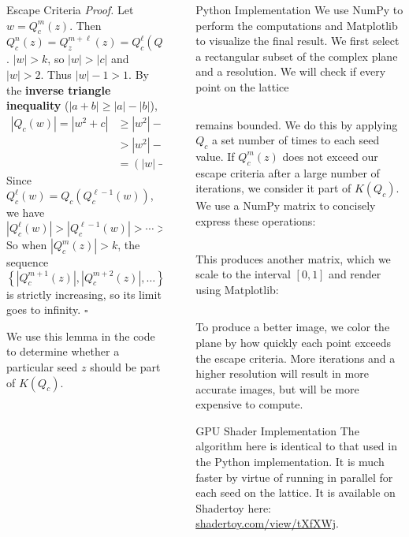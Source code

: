 \documentclass[final]{beamer}
\newlength{\sepwidth}
\newlength{\colwidth}
\newcommand{\separatorcolumn}{\begin{column}{\sepwidth}\end{column}}
\begin{document}
\begin{frame}[t]
\begin{columns}[t]
\begin{column}{\colwidth}
\begin{alertblock}{Escape Criteria}
		\textit{Proof.}
		Let $w = Q_c^{m}(z)$. Then $Q_c^{n}(z) = Q_z^{m + \ell}(z) = Q_c^{\ell}(Q_c^{m}(z))$.
		$|w| > k$, so $|w| > |c|$ and $|w| > 2$. Thus $|w| - 1 > 1$.
		By the \textbf{inverse triangle inequality} ($|a + b| \ge |a| - |b|$),
		\begin{align*}
			|Q_c(w)| = |w^2 + c| &\ge |w^2| - |c| \\
								 &> |w^2| - |w| \\
								 &= (|w| - 1)|w| > |w| > k
		\end{align*}
		Since $Q_c^{\ell}(w) = Q_c(Q_c^{\ell - 1}(w))$, we have \[
			|Q_c^{\ell}(w)| > |Q_c^{\ell - 1}(w)| > \cdots > |Q_c^{2}(w)| >|Q_c^{1}(w)| > |w| > k
		\]
		So when $|Q_c^{m}(z)| > k$, the sequence \[
			\left\{ |Q_c^{m + 1}(z)|, |Q_c^{m + 2}(z)|, \ldots \right\}
		\] is strictly increasing, so its limit goes to infinity. \hfill $\square$

		We use this lemma in the code to determine whether a particular
		seed $z$ should be part of $K(Q_c)$.
	\end{alertblock}

\end{column}

\separatorcolumn

\begin{column}{\colwidth}

	\begin{block}{Python Implementation}
		We use NumPy to perform the computations and Matplotlib
		to visualize the final result.
		We first select a rectangular subset of the complex plane
		and a resolution. We will check if every point on the lattice
		\inputminted[firstline=102,lastline=103]{python}{../visualize.py}
		remains bounded.
		We do this by applying $Q_c$ a set number of times to each seed value.
		If $Q^{m}_c(z)$ does not exceed our escape criteria after a large number
    of iterations, we consider it part of $K(Q_c)$.
		We use a NumPy matrix to concisely express these operations:
		\inputminted[firstline=108,lastline=113]{python}{../visualize.py}
		This produces another matrix, which we scale to the interval
		$[0, 1]$ and render using Matplotlib:
		\inputminted[firstline=118,lastline=118]{python}{../visualize.py}
		To produce a better image, we color the plane
		by how quickly each point exceeds the escape criteria.
		More iterations and a higher resolution
		will result in more accurate images, but will be more expensive to compute.
	\end{block}

	\begin{block}{GPU Shader Implementation}
		The algorithm here is identical to that used in the Python
		implementation.
		It is much faster by virtue of running in parallel for each seed
		on the lattice.
		It is available on Shadertoy here: \href{https://www.shadertoy.com/view/tXfXWj}{shadertoy.com/view/tXfXWj}.
		\inputminted[firstline=271,lastline=278]{glsl}{../render.glsl}
	\end{block}
\end{column}


\end{columns}
\end{frame}
\end{document}
